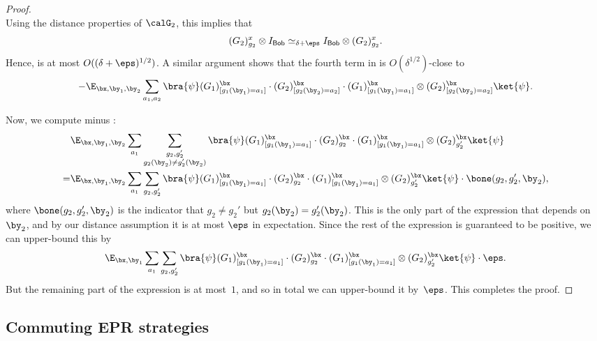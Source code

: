 \documentclass[11pt]{article}
\newcommand{\consistency}{\simeq}
\newcommand{\reg}[1]{{\mathsf{#1}}}
\begin{document}
\begin{proof}
\begin{equation*}
\end{equation*}
Using the distance properties of $\calG_2$, this implies that
\begin{equation*}
(G_2)^{x}_{g_2} \otimes I_{\reg{Bob}}
\consistency_{\delta + \eps} I_{\reg{Bob}} \otimes (G_2)^{x}_{g_2}.
\end{equation*}
Hence,  is at most $O((\delta+\eps)^{1/2})$.
A similar argument shows that the fourth term in 
is $O(\delta^{1/2})$-close to
\begin{equation}\label{eq:strife}
-\E_{\bx, \by_1, \by_2} \sum_{a_1, a_2} \bra{\psi}
(G_1)^{\bx}_{[g_1(\by_1) = a_1]} \cdot (G_2)^\bx_{[g_2(\by_2) = a_2]} \cdot (G_1)^{\bx}_{[g_1(\by_1) = a_1]} \otimes (G_2)^\bx_{[g_2(\by_2) = a_2]} \ket{\psi}.
\end{equation}

Now, we compute  minus :
\begin{align*}
&\E_{\bx, \by_1, \by_2} \sum_{a_1}\sum_{\substack{g_2, g_2'\\g_2(\by_2) \neq g_2'(\by_2)}} \bra{\psi}
	 (G_1)^{\bx}_{[g_1(\by_1) = a_1]} \cdot (G_2)^{\bx}_{g_2} \cdot (G_1)^{\bx}_{[g_1(\by_1) = a_1]} \otimes (G_2)^{\bx}_{g_2'} \ket{\psi}\\
=&\E_{\bx, \by_1, \by_2} \sum_{a_1}\sum_{g_2, g_2'} \bra{\psi}
	 (G_1)^{\bx}_{[g_1(\by_1) = a_1]} \cdot (G_2)^{\bx}_{g_2} \cdot (G_1)^{\bx}_{[g_1(\by_1) = a_1]} \otimes (G_2)^{\bx}_{g_2'} \ket{\psi}
	 	\cdot \bone(g_2, g_2', \by_2),
\end{align*}
where $\bone(g_2, g_2', \by_2)$ is the indicator that $g_2 \neq g_2'$ but $g_2(\by_2) = g_2'(\by_2)$.
This is the only part of the expression that depends on $\by_2$, and by our distance assumption it is at most $\eps$ in expectation.
Since the rest of the expression is guaranteed to be positive, we can upper-bound this by
\begin{equation*}
\E_{\bx, \by_1} \sum_{a_1}\sum_{g_2, g_2'} \bra{\psi}
	 (G_1)^{\bx}_{[g_1(\by_1) = a_1]} \cdot (G_2)^{\bx}_{g_2} \cdot (G_1)^{\bx}_{[g_1(\by_1) = a_1]} \otimes (G_2)^{\bx}_{g_2'} \ket{\psi} \cdot \eps.
\end{equation*}
But the remaining part of the expression is at most~$1$, and so in total we can upper-bound it by~$\eps$.
This completes the proof.
\end{proof}

\subsection{Commuting EPR strategies}
\end{document}
